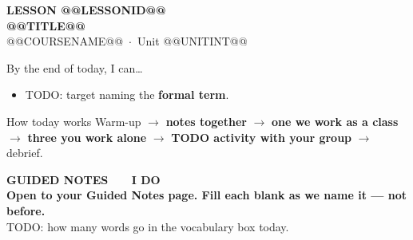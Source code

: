\documentclass[aspectratio=169, 11pt]{beamer}
\begin{document}
{
\begin{frame}[plain]
  \vspace{2.8cm}\hspace{0.55cm}%
  \begin{minipage}{0.9\textwidth}
    {\color{goldacc}\bfseries\small LESSON @@LESSONID@@}\\[0.5cm]
    {\color{white}\bfseries\LARGE @@TITLE@@}\\[1.2cm]
    {\color{skymid}\small @@COURSENAME@@~$\cdot$~Unit @@UNITINT@@}
  \end{minipage}
\end{frame}
}

\newcommand{\redink}[1]{{\color{redacc}\bfseries #1}}

\begin{frame}[t, plain]
  By the end of today, I can\ldots
  \begin{itemize}\setlength{\itemsep}{6pt}
    \item TODO: target naming the \textbf{formal term}.
  \end{itemize}
  \begin{block}{How today works}
    Warm-up $\to$ \textbf{notes together} $\to$ \textbf{one we work as a class} $\to$
    \textbf{three you work alone} $\to$ \textbf{TODO activity with your group} $\to$ debrief.
  \end{block}
\end{frame}

\begin{frame}[t, plain]
\end{frame}

{
\begin{frame}[plain]
  \vspace{1.8cm}\hspace{0.8cm}%
  \begin{minipage}{0.86\textwidth}
    {\color{goldacc}\bfseries\small GUIDED NOTES \ \textbullet\ \ I DO}\\[0.7cm]
    {\color{white}\bfseries\Large Open to your Guided Notes page. Fill each blank as we
    name it --- not before.}\\[0.9cm]
    {\color{skymid}\small TODO: how many words go in the vocabulary box today.}
  \end{minipage}
\end{frame}
}
\end{document}
